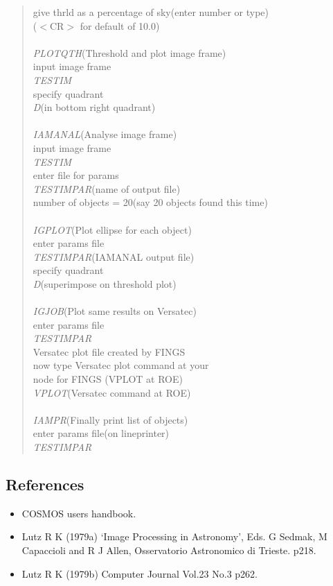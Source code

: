 \begin{quote}
\begin{tabbing}
\>give thrld as a percentage of sky\>(enter number or type)\\
\>($<$CR$>$ for default of 10.0)\\
\\
{\em PLOTQTH}\>\>(Threshold and plot image frame)\\
\>input image frame\\
{\em TESTIM}\\
\>specify quadrant\\
{\em D}\>\>(in bottom right quadrant)\\
\\
{\em IAMANAL}\>\>(Analyse image frame)\\
\>input image frame\\
{\em TESTIM}\\
\>enter file for params\\
{\em TESTIMPAR}\>\>(name of output file)\\
\>number of objects = 20\>(say 20 objects found this time)\\
\\
{\em IGPLOT}\>\>(Plot ellipse for each object)\\
\>enter params file\\
{\em TESTIMPAR}\>\>(IAMANAL output file)\\
\>specify quadrant\\
{\em D}\>\>(superimpose on threshold plot)\\
\\
{\em IGJOB}\>\>(Plot same results on Versatec)\\
\>enter params file\\
{\em TESTIMPAR}\\
\>Versatec plot file created by FINGS\\
\>now type Versatec plot command at your\\
\>node for FINGS (VPLOT at ROE)\\
{\em VPLOT}\>\>(Versatec command at ROE)\\
\\
{\em IAMPR}\>\>(Finally print list of objects)\\
\>enter params file\>(on lineprinter)\\
{\em TESTIMPAR}
\end{tabbing}
\end{quote}
\subsection {References}
\begin{itemize}
\item COSMOS users handbook.
\item Lutz R K (1979a) `Image Processing in Astronomy',  Eds. G Sedmak, M
Capaccioli and R J Allen, Osservatorio Astronomico di Trieste. p218.
\item Lutz R K (1979b) Computer Journal Vol.23 No.3 p262.
\end{itemize}

